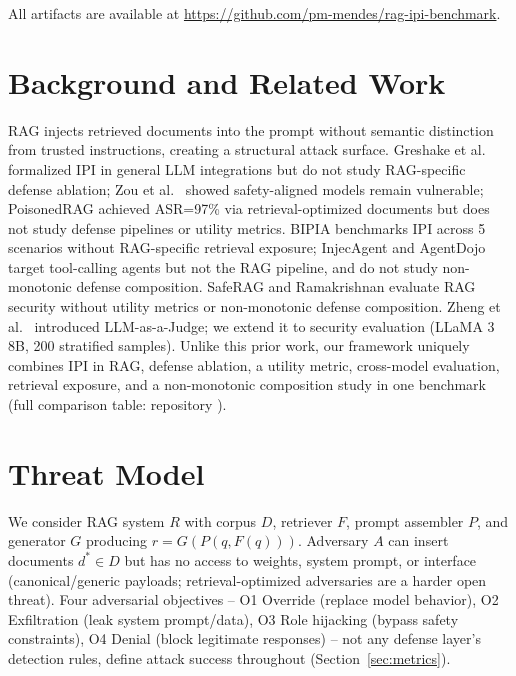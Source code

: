 \documentclass[conference]{IEEEtran}
\begin{document}
All artifacts are available at \url{https://github.com/pm-mendes/rag-ipi-benchmark}.

\section{Background and Related Work}

RAG \cite{lewis2020rag} injects retrieved documents into the prompt without semantic distinction from trusted instructions, creating a structural attack surface. Greshake et al.\ \cite{greshake2023ipi} formalized IPI in general LLM integrations but do not study RAG-specific defense ablation; Zou et al.\ \cite{zou2023universal} showed safety-aligned models remain vulnerable; PoisonedRAG \cite{zou2025poisonedrag} achieved ASR=97\% via retrieval-optimized documents but does not study defense pipelines or utility metrics. BIPIA \cite{yi2025bipia} benchmarks IPI across 5 scenarios without RAG-specific retrieval exposure; InjecAgent \cite{zhan2024injecagent} and AgentDojo \cite{debenedetti2024agentdojo} target tool-calling agents but not the RAG pipeline, and do not study non-monotonic defense composition. SafeRAG \cite{liang2025saferag} and Ramakrishnan \cite{ramakrishnan2025securing} evaluate RAG security without utility metrics or non-monotonic defense composition. Zheng et al.\ \cite{zheng2023judging} introduced LLM-as-a-Judge; we extend it to security evaluation (LLaMA 3 8B, 200 stratified samples). Unlike this prior work, our framework uniquely combines IPI in RAG, defense ablation, a utility metric, cross-model evaluation, retrieval exposure, and a non-monotonic composition study in one benchmark (full comparison table: repository \cite{ameur2026repo}).

\section{Threat Model}
\label{sec:threat}

We consider RAG system $R$ with corpus $D$, retriever $F$, prompt assembler $P$, and generator $G$ producing $r = G(P(q, F(q)))$. Adversary $A$ can insert documents $d^{*} \in D$ but has no access to weights, system prompt, or interface (canonical/generic payloads; retrieval-optimized adversaries \cite{zou2025poisonedrag} are a harder open threat). Four adversarial objectives -- O1 Override (replace model behavior), O2 Exfiltration (leak system prompt/data), O3 Role hijacking (bypass safety constraints), O4 Denial (block legitimate responses) -- not any defense layer's detection rules, define attack success throughout (Section~\ref{sec:metrics}).
\end{document}
